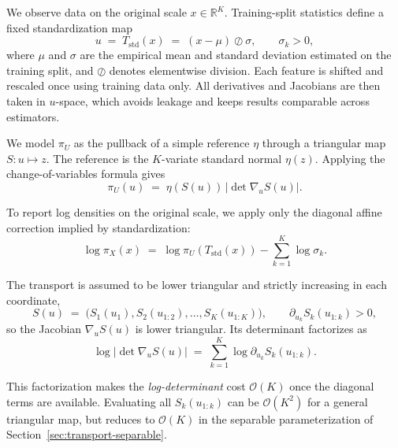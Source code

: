\documentclass[11pt,a4paper,twoside]{book}\usepackage[]{graphicx}\usepackage[]{xcolor}
\begin{document}
We observe data on the original scale $x \in \mathbb{R}^K$. Training-split statistics define a fixed standardization map
\begin{equation}
  u \;=\; T_{\mathrm{std}}(x) \;=\; (x-\mu)\oslash\sigma,\qquad \sigma_k>0,
  \label{eq:transport-standardise}
\end{equation}
where $\mu$ and $\sigma$ are the empirical mean and standard deviation estimated on the training split, and $\oslash$ denotes elementwise division. Each feature is shifted and rescaled once using training data only. All derivatives and Jacobians are then taken in $u$-space, which avoids leakage and keeps results comparable across estimators.

We model $\pi_U$ as the pullback of a simple reference $\eta$ through a triangular map $S:u\mapsto z$. The reference is the $K$-variate standard normal $\eta(z)$. Applying the change-of-variables formula gives
\begin{equation}
  \pi_U(u) \;=\; \eta\!\left(S(u)\right)\,\left|\det\nabla_u S(u)\right|.
  \label{eq:transport-pullback}
\end{equation}

To report log densities on the original scale, we apply only the diagonal affine correction implied by standardization:
\begin{equation}
  \log \pi_X(x) \;=\; \log \pi_U\!\left(T_{\mathrm{std}}(x)\right) - \sum_{k=1}^{K}\log\sigma_k.
  \label{eq:transport-affine}
\end{equation}

The transport is assumed to be lower triangular and strictly increasing in each coordinate,
\begin{equation}
  S(u) \;=\; \big(S_1(u_1), S_2(u_{1:2}), \ldots, S_K(u_{1:K})\big), 
  \qquad \partial_{u_k}S_k(u_{1:k})>0,
  \label{eq:transport-triangular}
\end{equation}
so the Jacobian $\nabla_u S(u)$ is lower triangular. Its determinant factorizes as
\begin{equation}
  \log \big|\det \nabla_u S(u)\big| \;=\; \sum_{k=1}^{K}\log \partial_{u_k}S_k(u_{1:k}).
  \label{eq:transport-det}
\end{equation}

This factorization makes the \emph{log-determinant} cost $\mathcal{O}(K)$ once the diagonal terms are available. Evaluating all $S_k(u_{1:k})$ can be $\mathcal{O}(K^2)$ for a general triangular map, but reduces to $\mathcal{O}(K)$ in the separable parameterization of Section~\ref{sec:transport-separable}.
\end{document}
